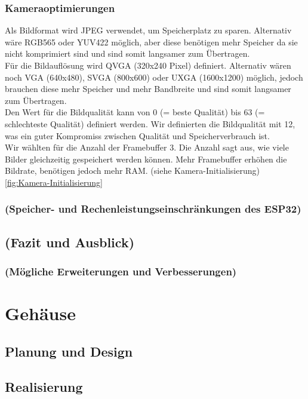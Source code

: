 \documentclass[ngerman,12pt,a4paper]{article}
\begin{document}
							\subsubsection*{Kameraoptimierungen}
	Als Bildformat wird JPEG verwendet, um Speicherplatz zu sparen. Alternativ wäre RGB565 oder YUV422 möglich, aber diese benötigen mehr Speicher da sie nicht komprimiert sind und sind somit langsamer zum Übertragen. \\[0.5cm]
	Für die Bildauflösung wird QVGA (320x240 Pixel) definiert. Alternativ wären noch VGA (640x480), SVGA (800x600) oder UXGA (1600x1200) möglich, jedoch brauchen diese mehr Speicher und mehr Bandbreite und sind somit langsamer zum Übertragen.\\[0.5cm]
	Den Wert für die Bildqualität kann von 0 (= beste Qualität) bis 63 (= schlechteste Qualität) definiert werden. Wir definierten die Bildqualität mit 12, was ein guter Kompromiss zwischen Qualität und Speicherverbrauch ist.\\[0.5cm]
	Wir wählten für die Anzahl der Framebuffer 3. Die Anzahl sagt aus, wie viele Bilder gleichzeitig gespeichert werden können. Mehr Framebuffer erhöhen die Bildrate, benötigen jedoch mehr RAM. (siehe Kamera-Initialisierung) \ref{fig:Kamera-Initialisierung}\\[0.5cm]
	
			\subsubsection{(Speicher- und Rechenleistungseinschränkungen des ESP32)}
					
		\subsection{(Fazit und Ausblick)}
		
			\subsubsection{(Mögliche Erweiterungen und Verbesserungen)}
	\newpage
	\section{Gehäuse}
	
		\subsection{Planung und Design} %
		
		\subsection{Realisierung} %
	
\end{document}
